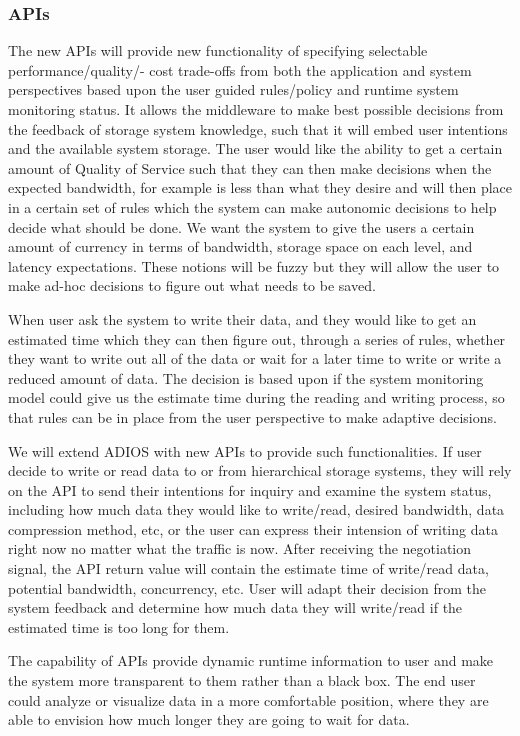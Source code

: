 \subsubsection{APIs}

The new APIs will provide new functionality of specifying selectable performance/quality/- cost trade-offs from both the application and system perspectives based upon the user guided rules/policy and runtime system monitoring status. It allows the middleware to make best possible decisions from the feedback of storage system knowledge, such that it will embed user intentions and the available system storage. The user would like the ability to get a certain amount of Quality of Service such that they can then make decisions when the expected bandwidth, for example is less than what they desire and will then place in a certain set of rules which the system can make autonomic decisions to help decide what should be done. We want the system to give the users a certain amount of currency in terms of bandwidth, storage space on each level, and latency expectations. These notions will be fuzzy but they will allow the user to make ad-hoc decisions to figure out what needs to be saved.

When user ask the system to write their data, and they would like to get an estimated time which they can then figure out, through a series of rules, whether they want to write out all of the data or wait for a later time to write or write a reduced amount of data. The decision is based upon if the system monitoring model could give us the estimate time during the reading and writing process, so that rules can be in place from the user perspective to make adaptive decisions. 

We will extend ADIOS with new APIs to provide such functionalities. If user decide to write or read data to or from hierarchical storage systems, they will rely on the API to send their intentions for inquiry and examine the system status, including how much data they would like to write/read, desired bandwidth, data compression method, etc, or the user can express their intension of writing data right now no matter what the traffic is now. After receiving the negotiation signal, the API return value will contain the estimate time of write/read data, potential bandwidth, concurrency, etc. User will adapt their decision from the system feedback and determine how much data they will write/read if the estimated time is too long for them. 

The capability of APIs provide dynamic runtime information to user and make the system more transparent to them rather than a black box. The end user could analyze or visualize data in a more comfortable position, where they are able to envision how much longer they are going to wait for data. 
